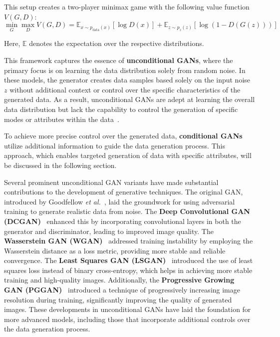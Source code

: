 \documentclass[12pt,DIV14,BCOR12mm,a4paper,footinclude=false,headinclude,parskip=half-,twoside,openright,cleardoublepage=empty,toc=index,bibliography=totoc,listof=totoc]{scrreprt}
\numberwithin{equation}{chapter}
\begin{document}
This setup creates a two-player minimax game with the following value function \( V(G, D) \):
\begin{equation}
\min_{G} \max_{D} V(G, D) = \mathbb{E}_{x \sim p_{\text{data}}(x)} [\log D(x)] + \mathbb{E}_{z \sim p_z(z)} [\log(1 - D(G(z)))]
\end{equation}

Here, \( \mathbb{E} \) denotes the expectation over the respective distributions.

This framework captures the essence of \textbf{unconditional GANs}, where the primary focus is on learning the data distribution solely from random noise. In these models, the generator creates data samples based solely on the input noise \( z \) without additional context or control over the specific characteristics of the generated data. As a result, unconditional GANs are adept at learning the overall data distribution but lack the capability to control the generation of specific modes or attributes within the data~\cite{lee2022generator}.

To achieve more precise control over the generated data, \textbf{conditional GANs} utilize additional information to guide the data generation process. This approach, which enables targeted generation of data with specific attributes, will be discussed in the following section.

Several prominent unconditional GAN variants have made substantial contributions to the development of generative techniques. The original GAN, introduced by Goodfellow \textit{et al.}~\cite{goodfellow2014generative}, laid the groundwork for using adversarial training to generate realistic data from noise. The \textbf{Deep Convolutional GAN (DCGAN)}~\cite{radford2015unsupervised} enhanced this by incorporating convolutional layers in both the generator and discriminator, leading to improved image quality. The \textbf{Wasserstein GAN (WGAN)}~\cite{arjovsky2017wasserstein} addressed training instability by employing the Wasserstein distance as a loss metric, providing more stable and reliable convergence. The \textbf{Least Squares GAN (LSGAN)}~\cite{mao2017least} introduced the use of least squares loss instead of binary cross-entropy, which helps in achieving more stable training and high-quality images. Additionally, the \textbf{Progressive Growing GAN (PGGAN)}~\cite{karras2017progressive} introduced a technique of progressively increasing image resolution during training, significantly improving the quality of generated images. These developments in unconditional GANs have laid the foundation for more advanced models, including those that incorporate additional controls over the data generation process.
\end{document}
